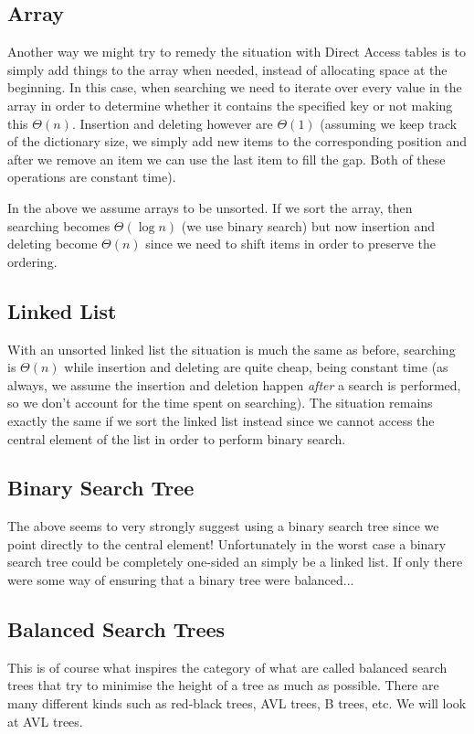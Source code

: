 \subsection{Array}
Another way we might try to remedy the situation with Direct Access tables is to simply add things to the array when needed, instead of allocating space at the beginning. In this case, when searching we need to iterate over every value in the array in order to determine whether it contains the specified key or not making this $\Theta(n)$. Insertion and deleting however are $\Theta(1)$ (assuming we keep track of the dictionary size, we simply add new items to the corresponding position and after we remove an item we can use the last item to fill the gap. Both of these operations are constant time).

In the above we assume arrays to be unsorted. If we sort the array, then searching becomes $\Theta(\log n)$ (we use binary search) but now insertion and deleting become $\Theta(n)$ since we need to shift items in order to preserve the ordering.

\subsection{Linked List}
With an unsorted linked list the situation is much the same as before, searching is $\Theta(n)$ while insertion and deleting are quite cheap, being constant time (as always, we assume the insertion and deletion happen \textit{after} a search is performed, so we don't account for the time spent on searching). The situation remains exactly the same if we sort the linked list instead since we cannot access the central element of the list in order to perform binary search.

\subsection{Binary Search Tree}
The above seems to very strongly suggest using a binary search tree since we point directly to the central element! Unfortunately in the worst case a binary search tree could be completely one-sided an simply be a linked list. If only there were some way of ensuring that a binary tree were balanced...

\subsection{Balanced Search Trees}
This is of course what inspires the category of what are called balanced search trees that try to minimise the height of a tree as much as possible. There are many different kinds such as red-black trees, AVL trees, B trees, etc. We will look at AVL trees.

